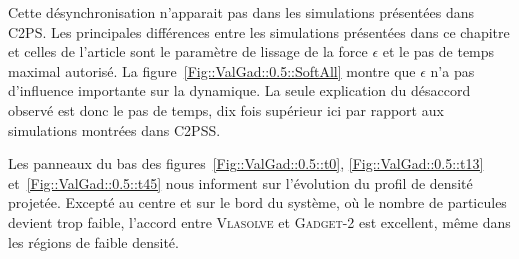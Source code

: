 		Cette désynchronisation n'apparait pas dans les simulations présentées
		dans C2PS. Les principales différences entre les simulations présentées dans ce chapitre et celles de l'article sont le paramètre de lissage de la force $\epsilon$ et le pas de temps
		maximal autorisé. La figure~\ref{Fig::ValGad::0.5::SoftAll} montre que $\epsilon$ n'a pas d'influence importante sur la dynamique.
		La seule explication du désaccord observé
		est donc le pas de temps, dix fois supérieur ici par rapport aux simulations montrées dans C2PSS.

		Les panneaux du bas des figures~\ref{Fig::ValGad::0.5::t0}, \ref{Fig::ValGad::0.5::t13} et~\ref{Fig::ValGad::0.5::t45} nous
		informent sur l'évolution du profil de densité projetée. Excepté au centre et sur le bord du système, où le nombre de particules devient trop
		faible, l'accord entre \textsc{Vlasolve} et \textsc{Gadget-2} est excellent, même dans les régions de faible densité.

			


